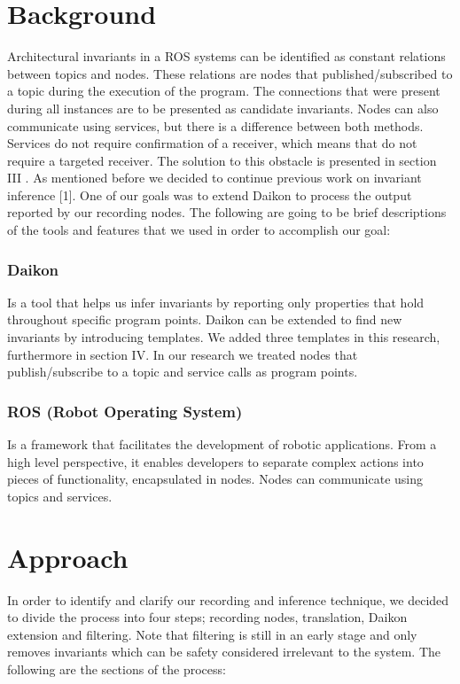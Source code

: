 \documentclass[10pt, conference]{IEEEtran}
\begin{document}
\section{Background}

 \indent Architectural invariants in a ROS systems can be identified as constant relations between topics and nodes. These relations are nodes that published/subscribed to a topic during the execution of the program. The connections that were present during all instances are to be presented as candidate invariants. Nodes can also communicate using services, but there is a difference between both methods. Services do not require confirmation of a receiver, which means that do not require a targeted receiver. The solution to this obstacle is presented in section III .
\newline \indent  As mentioned before we decided to continue previous work on invariant inference [1]. One of our goals was to extend Daikon to process the output reported by our recording nodes. The following are going to be brief descriptions of the tools and features that we used in order to accomplish our goal:

\subsubsection{Daikon}
Is a tool that helps us infer invariants by reporting only properties that hold throughout specific program points. Daikon can be extended to find new invariants by introducing templates. We added three templates in this research, furthermore in section IV. In our research we treated nodes that publish/subscribe to a topic and service calls as program points.
\subsubsection{ROS (Robot Operating System)}
Is a framework that facilitates the development of robotic applications. From a high level perspective, it enables developers to separate complex actions into pieces of functionality, encapsulated in nodes. Nodes can communicate using topics and services. 

\section{Approach}
In order to identify and clarify our recording and inference technique, we decided to divide the process into four steps; recording nodes, translation, Daikon extension and filtering. Note that filtering is still in an early stage and only removes invariants which can be safety considered irrelevant to the system. The following are the sections of the process:
\end{document}
